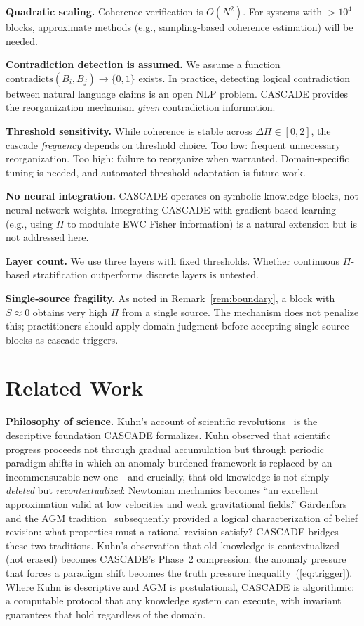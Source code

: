 \documentclass[11pt,a4paper]{article}
\theoremstyle{definition}
\newcommand{\tp}{\Pi}
\begin{document}
\textbf{Quadratic scaling.} Coherence verification is $O(N^2)$. For systems with $>
10^4$ blocks, approximate methods (e.g., sampling-based coherence estimation) will be
needed.

\textbf{Contradiction detection is assumed.} We assume a function
$\text{contradicts}(B_i, B_j) \to \{0, 1\}$ exists. In practice, detecting logical
contradiction between natural language claims is an open NLP problem. CASCADE provides
the reorganization mechanism \emph{given} contradiction information.

\textbf{Threshold sensitivity.} While coherence is stable across $\Delta\tp \in [0,
2]$, the cascade \emph{frequency} depends on threshold choice. Too low: frequent
unnecessary reorganization. Too high: failure to reorganize when warranted.
Domain-specific tuning is needed, and automated threshold adaptation is future work.

\textbf{No neural integration.} CASCADE operates on symbolic knowledge blocks, not
neural network weights. Integrating CASCADE with gradient-based learning (e.g., using
$\tp$ to modulate EWC Fisher information) is a natural extension but is not addressed
here.

\textbf{Layer count.} We use three layers with fixed thresholds. Whether continuous
$\tp$-based stratification outperforms discrete layers is untested.

\textbf{Single-source fragility.} As noted in Remark~\ref{rem:boundary}, a block with
$S \approx 0$ obtains very high $\tp$ from a single source. The mechanism does not
penalize this; practitioners should apply domain judgment before accepting
single-source blocks as cascade triggers.

\section{Related Work}\label{sec:related}

\textbf{Philosophy of science.}
Kuhn's account of scientific revolutions~\citep{kuhn1962structure} is the descriptive
foundation CASCADE formalizes. Kuhn observed that scientific progress proceeds not
through gradual accumulation but through periodic paradigm shifts in which an
anomaly-burdened framework is replaced by an incommensurable new one---and crucially,
that old knowledge is not simply \emph{deleted} but \emph{recontextualized}: Newtonian
mechanics becomes ``an excellent approximation valid at low velocities and weak
gravitational fields.'' G\"{a}rdenfors and the AGM tradition~\citep{alchourron1985logic,gardenfors1988knowledge}
subsequently provided a logical characterization of belief revision: what properties must
a rational revision satisfy? CASCADE bridges these two traditions. Kuhn's observation
that old knowledge is contextualized (not erased) becomes CASCADE's Phase~2 compression;
the anomaly pressure that forces a paradigm shift becomes the truth pressure
inequality~(\ref{eq:trigger}). Where Kuhn is descriptive and AGM is postulational,
CASCADE is algorithmic: a computable protocol that any knowledge system can execute,
with invariant guarantees that hold regardless of the domain.
\end{document}
